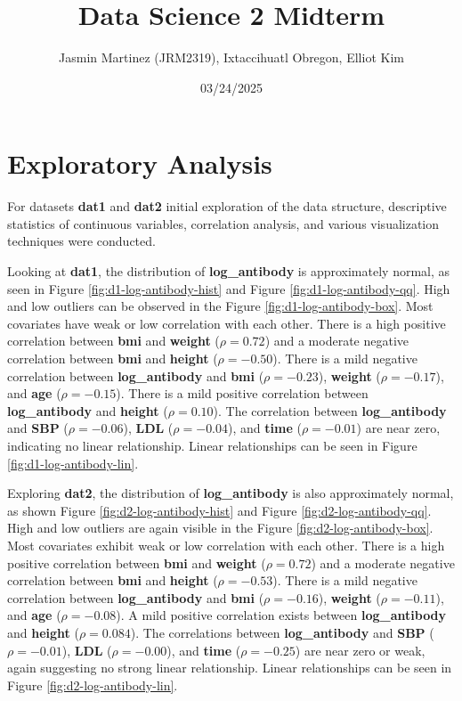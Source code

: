\documentclass[
]{article}
\title{Data Science 2 Midterm}
\author{Jasmin Martinez (JRM2319), Ixtaccihuatl Obregon, Elliot Kim}
\date{03/24/2025}
\begin{document}
\maketitle

{
\setcounter{tocdepth}{2}
\tableofcontents
}
\section{Exploratory Analysis}\label{exploratory-analysis}

For datasets \textbf{dat1} and \textbf{dat2} initial exploration of the data structure, descriptive statistics of continuous variables, correlation analysis, and various visualization techniques were conducted.

Looking at \textbf{dat1}, the distribution of \textbf{log\_antibody} is approximately normal, as seen in Figure \ref{fig:d1-log-antibody-hist} and Figure \ref{fig:d1-log-antibody-qq}. High and low outliers can be observed in the Figure \ref{fig:d1-log-antibody-box}. Most covariates have weak or low correlation with each other. There is a high positive correlation between \textbf{bmi} and \textbf{weight} (\(\rho = 0.72\)) and a moderate negative correlation between \textbf{bmi} and \textbf{height} (\(\rho = -0.50\)). There is a mild negative correlation between \textbf{log\_antibody} and \textbf{bmi} (\(\rho = -0.23\)), \textbf{weight} (\(\rho = -0.17\)), and \textbf{age} (\(\rho = -0.15\)). There is a mild positive correlation between \textbf{log\_antibody} and \textbf{height} (\(\rho = 0.10\)). The correlation between \textbf{log\_antibody} and \textbf{SBP} (\(\rho = -0.06\)), \textbf{LDL} (\(\rho = -0.04\)), and \textbf{time} (\(\rho = -0.01\)) are near zero, indicating no linear relationship. Linear relationships can be seen in Figure \ref{fig:d1-log-antibody-lin}.

Exploring \textbf{dat2}, the distribution of \textbf{log\_antibody} is also approximately normal, as shown Figure \ref{fig:d2-log-antibody-hist} and Figure \ref{fig:d2-log-antibody-qq}. High and low outliers are again visible in the Figure \ref{fig:d2-log-antibody-box}. Most covariates exhibit weak or low correlation with each other. There is a high positive correlation between \textbf{bmi} and \textbf{weight} (\(\rho = 0.72\)) and a moderate negative correlation between \textbf{bmi} and \textbf{height} (\(\rho = -0.53\)). There is a mild negative correlation between \textbf{log\_antibody} and \textbf{bmi} (\(\rho = -0.16\)), \textbf{weight} (\(\rho = -0.11\)), and \textbf{age} (\(\rho = -0.08\)). A mild positive correlation exists between \textbf{log\_antibody} and \textbf{height} (\(\rho = 0.084\)). The correlations between \textbf{log\_antibody} and \textbf{SBP} (\(\rho = -0.01\)), \textbf{LDL} (\(\rho = -0.00\)), and \textbf{time} (\(\rho = -0.25\)) are near zero or weak, again suggesting no strong linear relationship. Linear relationships can be seen in Figure \ref{fig:d2-log-antibody-lin}.
\end{document}
